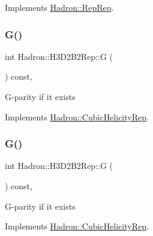 Implements \mbox{\hyperlink{structHadron_1_1RepRep_a92c8802e5ed7afd7da43ccfd5b7cd92b}{Hadron\+::\+Rep\+Rep}}.

\mbox{\label{structHadron_1_1H3D2B2Rep_a99a41bf1ea4b0ac1918c75c46479fb5e}} 
\subsubsection{\texorpdfstring{G()}{G()}\hspace{0.1cm}{\footnotesize\ttfamily [1/3]}}
{\footnotesize\ttfamily int Hadron\+::\+H3\+D2\+B2\+Rep\+::G (\begin{DoxyParamCaption}{ }\end{DoxyParamCaption}) const\hspace{0.3cm}{\ttfamily [inline]}, {\ttfamily [virtual]}}

G-\/parity if it exists 

Implements \mbox{\hyperlink{structHadron_1_1CubicHelicityRep_a50689f42be1e6170aa8cf6ad0597018b}{Hadron\+::\+Cubic\+Helicity\+Rep}}.

\mbox{\label{structHadron_1_1H3D2B2Rep_a99a41bf1ea4b0ac1918c75c46479fb5e}} 
\subsubsection{\texorpdfstring{G()}{G()}\hspace{0.1cm}{\footnotesize\ttfamily [2/3]}}
{\footnotesize\ttfamily int Hadron\+::\+H3\+D2\+B2\+Rep\+::G (\begin{DoxyParamCaption}{ }\end{DoxyParamCaption}) const\hspace{0.3cm}{\ttfamily [inline]}, {\ttfamily [virtual]}}

G-\/parity if it exists 

Implements \mbox{\hyperlink{structHadron_1_1CubicHelicityRep_a50689f42be1e6170aa8cf6ad0597018b}{Hadron\+::\+Cubic\+Helicity\+Rep}}.

\mbox{\label{structHadron_1_1H3D2B2Rep_a99a41bf1ea4b0ac1918c75c46479fb5e}} 
